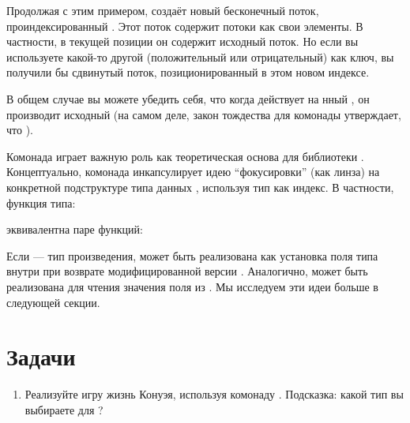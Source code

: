 Продолжая с этим примером,  создаёт новый бесконечный
поток, проиндексированный . Этот поток содержит потоки как свои
элементы. В частности, в текущей позиции он содержит
исходный поток. Но если вы используете какой-то другой  (положительный или
отрицательный) как ключ, вы получили бы сдвинутый поток, позиционированный в этом
новом индексе.

В общем случае вы можете убедить себя, что когда  действует на
нный , он производит исходный
 (на самом деле, закон тождества для комонады утверждает, что
).

Комонада  играет важную роль как теоретическая
основа для библиотеки . Концептуально,
комонада  инкапсулирует идею ``фокусировки'' (как
линза) на конкретной подструктуре типа данных , используя
тип  как индекс. В частности, функция типа:

эквивалентна паре функций:

Если  --- тип произведения,  может быть реализована как
установка поля типа  внутри  при
возврате модифицированной версии . Аналогично, 
может быть реализована для чтения значения поля  из
. Мы исследуем эти идеи больше в следующей секции.

\section{Задачи}

\begin{enumerate}
  \tightlist
  \item
        Реализуйте игру жизнь Конуэя, используя комонаду .
        Подсказка: какой тип вы выбираете для ?
\end{enumerate}
